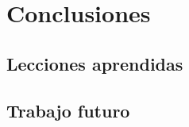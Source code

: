 \chapter{Conclusiones}
\label{chap:conclusiones}

\section{Lecciones aprendidas}
\label{sec:lecciones_aprendidas}

\section{Trabajo futuro}
\label{sec:trabajo_futuro}